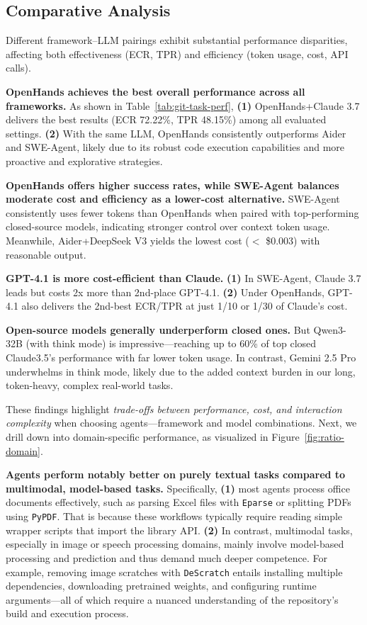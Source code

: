 \documentclass[letterpaper]{article} %
\begin{document}
\subsection{Comparative Analysis}

Different framework–LLM pairings exhibit substantial performance disparities, affecting both effectiveness (ECR, TPR) and efficiency (token usage, cost, API calls).

\textbf{OpenHands achieves the best overall performance across all frameworks.}
As shown in Table~\ref{tab:git-task-perf}, \textbf{(1)} OpenHands+Claude 3.7 delivers the best results (ECR 72.22\%, TPR 48.15\%) among all evaluated settings. \textbf{(2)} With the same LLM, OpenHands consistently outperforms Aider and SWE-Agent, likely due to its robust code execution capabilities and more proactive and explorative strategies. 

\textbf{OpenHands offers higher success rates, while SWE-Agent balances moderate cost and efficiency as a lower-cost alternative.}
SWE-Agent consistently uses fewer tokens than OpenHands when paired with top-performing closed-source models, indicating stronger control over context token usage. 
Meanwhile, Aider+DeepSeek V3 yields the lowest cost ($<$ \$0.003) with reasonable output.

\textbf{GPT-4.1 is more cost-efficient than Claude.}  
\textbf{(1)} In SWE-Agent, Claude 3.7 leads but costs 2x more than 2nd-place GPT-4.1. 
\textbf{(2)} Under OpenHands, GPT-4.1  also delivers the 2nd-best ECR/TPR at just 1/10 or 1/30 of Claude's cost. 


\textbf{Open-source models generally underperform closed ones.} But Qwen3-32B (with think mode) is impressive---reaching up to 60\% of top closed Claude3.5's performance with far lower token usage. In contrast, Gemini 2.5 Pro underwhelms in think mode, likely due to the added context burden in our long, token-heavy, complex real-world tasks.


These findings highlight \textit{trade-offs between performance, cost, and interaction complexity} when choosing agents---framework and model combinations.
Next, we drill down into domain-specific performance, as visualized in Figure~\ref{fig:ratio-domain}. 

\textbf{Agents perform notably better on purely textual tasks compared to multimodal, model-based tasks.}
Specifically, \textbf{(1) }most agents process office documents effectively, such as parsing Excel files with \texttt{Eparse} or splitting PDFs using \texttt{PyPDF}. That is because these workflows typically require reading simple wrapper scripts that import the library API. 
\textbf{(2)} In contrast, multimodal tasks, especially in image or speech processing domains, mainly involve model-based processing and prediction and thus demand much deeper competence. 
For example, removing image scratches with \texttt{DeScratch} entails installing multiple dependencies, downloading pretrained weights, and configuring runtime arguments---all of which require a nuanced understanding of the repository’s build and execution process. 
\end{document}
